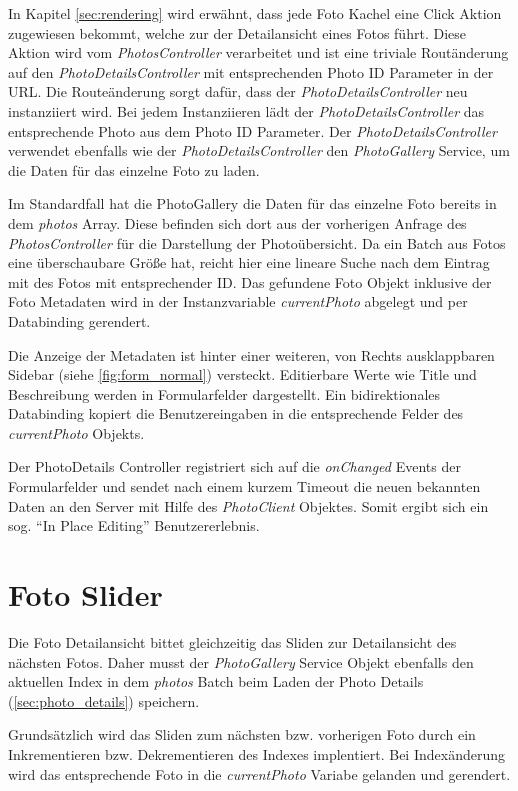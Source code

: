 In Kapitel \ref{sec:rendering} wird erwähnt, dass jede Foto Kachel eine Click Aktion zugewiesen bekommt, welche zur der Detailansicht eines Fotos führt. Diese Aktion wird vom \textit{PhotosController} verarbeitet und ist eine triviale Routänderung auf den \textit{PhotoDetailsController} mit entsprechenden Photo ID Parameter in der URL. Die Routeänderung sorgt dafür, dass der \textit{PhotoDetailsController} neu instanziiert wird. Bei jedem Instanziieren lädt der \textit{PhotoDetailsController} das entsprechende Photo aus dem  Photo ID Parameter. Der \textit{PhotoDetailsController} verwendet ebenfalls wie der \textit{PhotoDetailsController} den \textit{PhotoGallery} Service, um die Daten für das einzelne Foto zu laden. 

Im Standardfall hat die PhotoGallery die Daten für das einzelne Foto bereits in dem \textit{photos} Array. Diese befinden sich dort aus der vorherigen Anfrage des \textit{PhotosController} für die Darstellung der Photoübersicht. Da ein Batch aus Fotos eine überschaubare Größe hat, reicht hier eine lineare Suche nach dem Eintrag mit des Fotos mit entsprechender ID. Das gefundene Foto Objekt inklusive der Foto Metadaten wird in der Instanzvariable \textit{currentPhoto} abgelegt und per Databinding gerendert. 

Die Anzeige der Metadaten ist hinter einer weiteren, von Rechts ausklappbaren Sidebar (siehe \ref{fig:form_normal}) versteckt. Editierbare Werte wie Title und Beschreibung werden in Formularfelder dargestellt. Ein bidirektionales Databinding kopiert die Benutzereingaben in die entsprechende Felder des \textit{currentPhoto} Objekts. 

Der PhotoDetails Controller registriert sich auf die \textit{onChanged } Events der Formularfelder und sendet nach einem kurzem Timeout die neuen bekannten Daten an den Server mit Hilfe des \textit{PhotoClient} Objektes. Somit ergibt sich ein sog. ``In Place Editing'' Benutzererlebnis.

\section{Foto Slider}
\label{sec:photo_slider}

Die Foto Detailansicht bittet gleichzeitig das Sliden zur Detailansicht des nächsten Fotos. Daher musst der \textit{PhotoGallery} Service Objekt ebenfalls den aktuellen Index in dem \textit{photos} Batch beim Laden der Photo Details (\ref{sec:photo_details}) speichern.

Grundsätzlich wird das Sliden zum nächsten bzw. vorherigen Foto durch ein Inkrementieren bzw. Dekrementieren des Indexes implentiert. Bei Indexänderung wird das entsprechende Foto in die \textit{currentPhoto} Variabe gelanden und gerendert.

